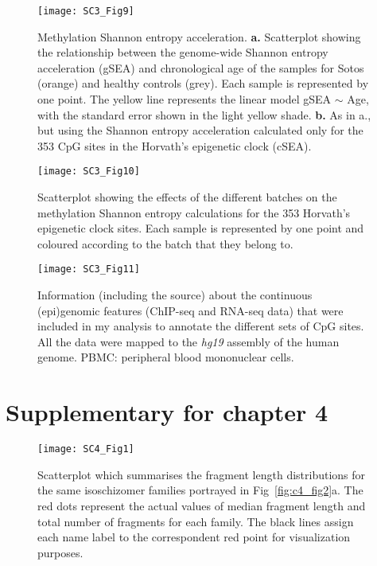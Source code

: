 \begin{figure}[htbp!] 
	\centering    
	\texttt{[image: SC3\_Fig9]}
	\caption[Methylation Shannon entropy acceleration]{Methylation Shannon entropy acceleration. \textbf{a.} Scatterplot showing the relationship between the genome-wide Shannon entropy acceleration (\acrshort{gSEA}) and chronological age of the samples for Sotos (orange) and healthy controls (grey). Each sample is represented by one point. The yellow line represents the linear model gSEA $\sim$ Age, with the standard error shown in the light yellow shade. \textbf{b.} As in a., but using the Shannon entropy acceleration calculated only for the 353 CpG sites in the Horvath's epigenetic clock (\acrshort{cSEA}).}
	\label{fig:sc3_fig9}
\end{figure}

\begin{figure}[htbp!] 
	\centering    
	\texttt{[image: SC3\_Fig10]}
	\caption[Batch effects in the methylation Shannon entropy for the epigenetic clock sites]{Scatterplot showing the effects of the different batches on the methylation Shannon entropy calculations for the 353 Horvath's epigenetic clock sites. Each sample is represented by one point and coloured according to the batch that they belong to. }
	\label{fig:sc3_fig10}
\end{figure}

		

\begin{figure}[htbp!] 
	\centering    
	\texttt{[image: SC3\_Fig11]}
	\caption[Information for the continuous (epi)genomic features]{Information (including the source) about the continuous (epi)genomic features (\acrshort{ChIP-seq} and \acrshort{RNA-seq} data) that were included in my analysis to annotate the different sets of CpG sites. All the data were mapped to the \textit{\acrshort{hg19}} assembly of the human genome. \acrshort{PBMC}: peripheral blood mononuclear cells.}
	\label{fig:sc3_fig11}
\end{figure}

\clearpage

\renewcommand{\thesection}{S.3}   
\section{Supplementary for chapter 4}

\renewcommand\thefigure{S3.\arabic{figure}}    
\bigskip

\begin{figure}[htbp!] 
	\centering    
	\setcounter{figure}{0}
	\texttt{[image: SC4\_Fig1]}
	\caption[Scatterplot of fragment length distributions for the isoschizomer families]{Scatterplot which summarises the fragment length distributions for the same isoschizomer families portrayed in Fig~\ref{fig:c4_fig2}a. The red dots represent the actual values of median fragment length and total number of fragments for each family. The black lines assign each name label to the correspondent red point for visualization purposes.}
	\label{fig:sc4_fig1}
\end{figure}

